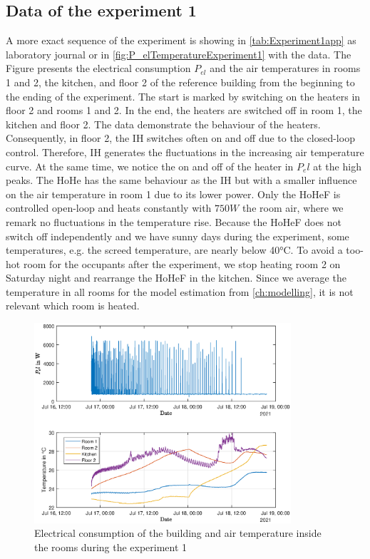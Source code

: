 \subsection{Data of the experiment 1}
\label{subsec:Data of the experiment 1}
A more exact sequence of the experiment is showing in \autoref{tab:Experiment1app} as laboratory journal or in \autoref{fig:P_elTemperatureExperiment1} with the data. The Figure presents the electrical consumption $P_{el}$ and the air temperatures in rooms 1 and 2, the kitchen, and floor 2 of the reference building from the beginning to the ending of the experiment. The start is marked by switching on the heaters in floor 2 and rooms 1 and 2. In the end, the heaters are switched off in room 1, the kitchen and floor 2. \newline 
The data demonstrate the behaviour of the heaters. Consequently, in floor 2, the IH switches often on and off due to the closed-loop control. Therefore, IH generates the fluctuations in the increasing air temperature curve. At the same time, we notice the on and off of the heater in $P_el$ at the high peaks. The HoHe has the same behaviour as the IH but with a smaller influence on the air temperature in room 1 due to its lower power. \newline
Only the HoHeF is controlled open-loop and heats constantly with $750 W$ the room air, where we remark no fluctuations in the temperature rise. Because the HoHeF does not switch off independently and we have sunny days during the experiment, some temperatures, e.g. the screed temperature, are nearly below 40°C. To avoid a too-hot room for the occupants after the experiment, we stop heating room 2 on Saturday night and rearrange the HoHeF in the kitchen. Since we average the temperature in all rooms for the model estimation from \autoref{ch:modelling}, it is not relevant which room is heated.
\begin{figure}
            \centering
            \includegraphics[width=0.85\textwidth]{figure/P_el_trainingsdaten_latex.eps}
           \caption{Electrical consumption of the building and air temperature inside the rooms during the experiment 1}
           \label{fig:P_elTemperatureExperiment1}
    \end{figure}

